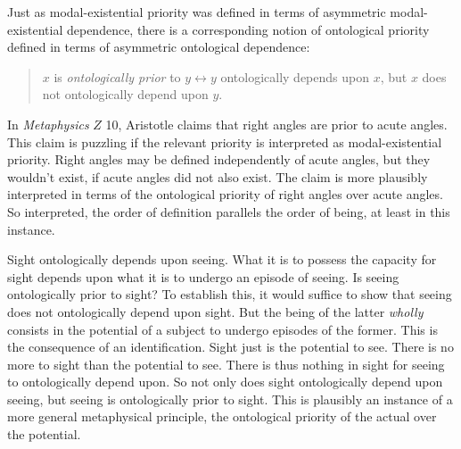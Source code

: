 \documentclass[12pt]{article}
\begin{document}

Just as modal-existential priority was defined in terms of asymmetric modal-existential dependence, there is a corresponding notion of ontological priority defined in terms of asymmetric ontological dependence:
\begin{quote}
	\( x \) is \emph{ontologically prior} to \( y  \leftrightarrow  y \) ontologically depends upon \( x \), but \( x \) does not ontologically depend upon \( y \).
\end{quote}
In \emph{Metaphysics} \( Z \) 10, Aristotle claims that right angles are prior to acute angles. This claim is puzzling if the relevant priority is interpreted as modal-existential priority. Right angles may be defined independently of acute angles, but they wouldn't exist, if acute angles did not also exist. The claim is more plausibly interpreted in terms of the ontological priority of right angles over acute angles. So interpreted, the order of definition parallels the order of being, at least in this instance.

Sight ontologically depends upon seeing. What it is to possess the capacity for sight depends upon what it is to undergo an episode of seeing. Is seeing ontologically prior to sight? To establish this, it would suffice to show that seeing does not ontologically depend upon sight. But the being of the latter \emph{wholly} consists in the potential of a subject to undergo episodes of the former. This is the consequence of an identification. Sight just is the potential to see. There is no more to sight than the potential to see. There is thus nothing in sight for seeing to ontologically depend upon. So not only does sight ontologically depend upon seeing, but seeing is ontologically prior to sight. This is plausibly an instance of a more general metaphysical principle, the ontological priority of the actual over the potential.
\end{document}
